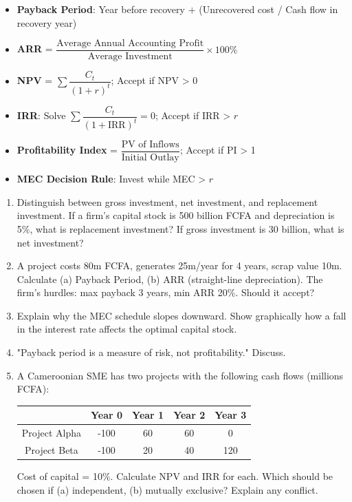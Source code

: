 \documentclass[11pt]{article}
\newcounter{popsec}
\newcounter{popsub}
\newcommand{\courssub}[1]{%
  \stepcounter{popsub}%
  \par\vspace{9pt}\noindent{\popxbold\fontsize{11.5}{13}\selectfont\color{popink}{\color{poporange}\thepopsec.\thepopsub}\hspace{6pt}#1}\par\nopagebreak\vspace{4pt}
}
\begin{document}
\courssub{Summary of key formulas}

\begin{aretenir}
\begin{itemize}
    \item \textbf{Payback Period}: Year before recovery $+$ (Unrecovered cost / Cash flow in recovery year)
    \item \textbf{ARR} = $\dfrac{\text{Average Annual Accounting Profit}}{\text{Average Investment}} \times 100\%$
    \item \textbf{NPV} = $\sum \dfrac{C_t}{(1+r)^t}$; Accept if NPV > 0
    \item \textbf{IRR}: Solve $\sum \dfrac{C_t}{(1+\text{IRR})^t} = 0$; Accept if IRR > $r$
    \item \textbf{Profitability Index} = $\dfrac{\text{PV of Inflows}}{\text{Initial Outlay}}$; Accept if PI > 1
    \item \textbf{MEC Decision Rule}: Invest while MEC > $r$
\end{itemize}
\end{aretenir}

\begin{exercice}
\begin{enumerate}
    \item Distinguish between gross investment, net investment, and replacement investment. If a firm's capital stock is 500 billion FCFA and depreciation is 5\%, what is replacement investment? If gross investment is 30 billion, what is net investment?
    \item A project costs 80m FCFA, generates 25m/year for 4 years, scrap value 10m. Calculate (a) Payback Period, (b) ARR (straight-line depreciation). The firm's hurdles: max payback 3 years, min ARR 20\%. Should it accept?
    \item Explain why the MEC schedule slopes downward. Show graphically how a fall in the interest rate affects the optimal capital stock.
    \item "Payback period is a measure of risk, not profitability." Discuss.
    \item A Cameroonian SME has two projects with the following cash flows (millions FCFA):
    \begin{center}
    \begin{tabular}{|c|cccc|}\hline
    & Year 0 & Year 1 & Year 2 & Year 3 \\ \hline
    Project Alpha & -100 & 60 & 60 & 0 \\
    Project Beta  & -100 & 20 & 40 & 120 \\ \hline
    \end{tabular}
    \end{center}
    Cost of capital = 10\%. Calculate NPV and IRR for each. Which should be chosen if (a) independent, (b) mutually exclusive? Explain any conflict.
\end{enumerate}
\end{exercice}
\end{document}
